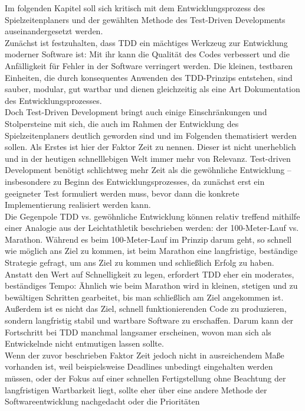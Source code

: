 
Im folgenden Kapitel soll sich kritisch mit dem Entwicklungsprozess des 
Spielzeitenplaners und der gewählten Methode des Test-Driven Developments 
auseinandergesetzt werden. \\ 
Zunächst ist festzuhalten, dass TDD ein mächtiges Werkzeug zur Entwicklung moderner 
Software ist: Mit ihr kann die Qualität des Codes verbessert und die Anfälligkeit für 
Fehler in der Software verringert werden. Die kleinen, testbaren Einheiten, die durch 
konsequentes Anwenden des TDD-Prinzips entstehen, sind sauber, modular, gut wartbar und 
dienen gleichzeitig als eine Art Dokumentation des Entwicklungsprozesses. \\ 
Doch Test-Driven Development bringt auch einige Einschränkungen und Stolpersteine mit 
sich, die auch im Rahmen der Entwicklung des Spielzeitenplaners deutlich geworden sind 
und im Folgenden thematisiert werden sollen. Als Erstes ist hier der Faktor Zeit zu 
nennen. Dieser ist nicht unerheblich und in der heutigen schnelllebigen Welt immer mehr 
von Relevanz. Test-driven Development benötigt schlichtweg mehr Zeit als die gewöhnliche Entwicklung -- insbesondere zu Beginn des Entwicklungsprozesses, da zunächst erst ein 
geeigneter Test formuliert werden muss, bevor dann die konkrete Implementierung 
realisiert werden kann. \\ 
Die Gegenpole TDD vs. gewöhnliche Entwicklung können relativ treffend mithilfe einer 
Analogie aus der Leichtathletik beschrieben werden: der 100-Meter-Lauf vs. Marathon. 
Während es beim 100-Meter-Lauf im Prinzip darum geht, so schnell wie möglich ans Ziel zu 
kommen, ist beim Marathon eine langfristige, beständige Strategie gefragt, um ans Ziel zu 
kommen und schließlich Erfolg zu haben. Anstatt den Wert auf Schnelligkeit zu legen, 
erfordert TDD eher ein moderates, beständiges Tempo: Ähnlich wie beim Marathon wird in 
kleinen, stetigen und zu bewältigen Schritten gearbeitet, bis man schließlich am Ziel 
angekommen ist. Außerdem ist es nicht das Ziel, schnell funktionierenden Code zu 
produzieren, sondern langfristig stabil und wartbare Software zu erschaffen. Darum kann 
der Fortschritt bei TDD manchmal langsamer erscheinen, wovon man sich als Entwickelnde 
nicht entmutigen lassen sollte. \\ 
Wenn der zuvor beschrieben Faktor Zeit jedoch nicht in ausreichendem Maße vorhanden ist, 
weil beispielsweise Deadlines unbedingt eingehalten werden müssen, oder der Fokus auf 
einer schnellen Fertigstellung ohne Beachtung der langfristigen Wartbarkeit liegt, sollte 
eher über eine andere Methode der Softwareentwicklung nachgedacht oder die Prioritäten 
